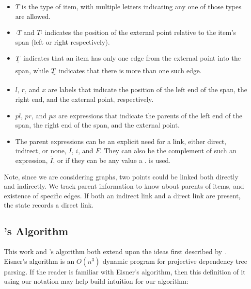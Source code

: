 \begin{itemize}
  \item $T$ is the type of item, with multiple letters indicating any one of those types are allowed.
  \item \textbf{$\cdotp$}$T$ and $T$\textbf{$\cdotp$} indicates the position of the external point relative to the item's span (left or right respectively).
  \item $\dotuline{T}$ indicates that an item has only one edge from the external point into the span, while $\uwave{T}$ indicates that there is more than one such edge.
  \item $l$, $r$, and $x$ are labels that indicate the position of the left end of the span, the right end, and the external point, respectively.
  \item $pl$, $pr$, and $px$ are expressions that indicate the parents of the left end of the span, the right end of the span, and the external point.
  \item The parent expressions can be an explicit need for a link, either direct, indirect, or none, \myeg $I$, $i$, and $F$.
  They can also be the complement of such an expression, \myeg $\overline{I}$, or if they can be any value a $.$ is used.
\end{itemize}

Note, since we are considering graphs, two points could be linked both directly and indirectly.
We track parent information to know about parents of items, and existence of specific edges.
If both an indirect link and a direct link are present, the state records a direct link.

\subsection{\textcite{eisner:1996}'s Algorithm}

This work and \textcite{ec}'s algorithm both extend upon the ideas first described by \textcite{eisner:1996}.
Eisner's algorithm is an $O(n^3)$ dynamic program for projective dependency tree parsing.
If the reader is familiar with Eisner's algorithm, then this definition of it using our notation may help build intuition for our algorithm:

